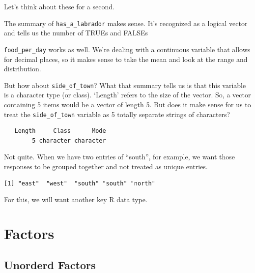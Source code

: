 \documentclass[
  letterpaper,
  DIV=11,
  numbers=noendperiod]{scrreprt}
\newenvironment{Shaded}{\begin{snugshade}}{\end{snugshade}}
\newcommand{\FunctionTok}[1]{\textcolor[rgb]{0.28,0.35,0.67}{#1}}
\newcommand{\NormalTok}[1]{\textcolor[rgb]{0.00,0.23,0.31}{#1}}
\newcommand{\SpecialCharTok}[1]{\textcolor[rgb]{0.37,0.37,0.37}{#1}}
\begin{document}
Let's think about these for a second.

The summary of \texttt{has\_a\_labrador} makes sense. It's recognized as
a logical vector and tells us the number of TRUEs and FALSEs

\texttt{food\_per\_day} works as well. We're dealing with a continuous
variable that allows for decimal places, so it makes sense to take the
mean and look at the range and distribution.

But how about \texttt{side\_of\_town}? What that summary tells us is
that this variable is a character type (or class). `Length' refers to
the size of the vector. So, a vector containing 5 items would be a
vector of length 5. But does it make sense for us to treat the
\texttt{side\_of\_town} variable as 5 totally separate strings of
characters?

\begin{Shaded}
\end{Shaded}

\begin{verbatim}
   Length     Class      Mode 
        5 character character 
\end{verbatim}

Not quite. When we have two entries of ``south'', for example, we want
those responses to be grouped together and not treated as unique
entries.

\begin{Shaded}
\end{Shaded}

\begin{verbatim}
[1] "east"  "west"  "south" "south" "north"
\end{verbatim}

For this, we will want another key R data type.

\section{Factors}\label{factors}

\subsection{Unorderd Factors}\label{unorderd-factors}
\end{document}

